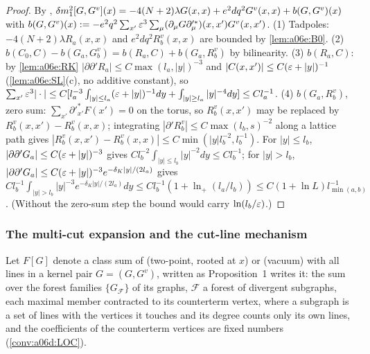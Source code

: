 \begin{proof}
By \cite[(1.23)]{Ba3}, $\delta m^2_1[G,G^v](x)=-4(N+2)\lambda G(x,x)+e^2dq^2G^v(x,x)+b(G,G^v)(x)$ with $b(G,G^v)(x):=-e^2q^2\sum_{x'}\varepsilon^3\sum_\mu(\partial_\mu G\partial'^*_\mu)(x,x')G^v(x,x')$. (1) Tadpoles: $-4(N+2)\lambda R_a(x,x)$ and $e^2dq^2R^v_b(x,x)$ are bounded by \cref{lem:a06e:B0}. (2) $b(C_0,C)-b(G_a,G^v_b)=b(R_a,C)+b(G_a,R^v_b)$ by bilinearity. (3) $b(R_a,C)$: by \cref{lem:a06e:RK} $|\partial\partial'R_a|\le C\max(l_a,|y|)^{-3}$ and $|C(x,x')|\le C(\varepsilon+|y|)^{-1}$ (\cref{lem:a06e:SL}(c), no additive constant), so $\sum_{x'}\varepsilon^3|\cdot|\le C[l_a^{-3}\int_{|y|\le l_a}(\varepsilon+|y|)^{-1}dy+\int_{|y|\ge l_a}|y|^{-4}dy]\le Cl_a^{-1}$. (4) $b(G_a,R^v_b)$, zero sum: $\sum_{x'}\partial'^*_{x'}F(x')=0$ on the torus, so $R^v_b(x,x')$ may be replaced by $R^v_b(x,x')-R^v_b(x,x)$; integrating $|\partial'R^v_b|\le C\max(l_b,s)^{-2}$ along a lattice path gives $|R^v_b(x,x')-R^v_b(x,x)|\le C\min(|y|l_b^{-2},l_b^{-1})$. For $|y|\le l_b$, $|\partial\partial'G_a|\le C(\varepsilon+|y|)^{-3}$ gives $Cl_b^{-2}\int_{|y|\le l_b}|y|^{-2}dy\le Cl_b^{-1}$; for $|y|>l_b$, $|\partial\partial'G_a|\le C(\varepsilon+|y|)^{-3}e^{-\delta_K|y|/(2l_a)}$ gives $Cl_b^{-1}\int_{|y|>l_b}|y|^{-3}e^{-\delta_K|y|/(2l_a)}dy\le Cl_b^{-1}(1+\ln_+(l_a/l_b))\le C(1+\ln L)l_{\min(a,b)}^{-1}$. (Without the zero-sum step the bound would carry $\ln(l_b/\varepsilon)$.)
\end{proof}

\subsubsection*{The multi-cut expansion and the cut-line mechanism}

Let $F[G]$ denote a class sum of \cite[(1.23)]{Ba3} (two-point, rooted at $x$) or \cite[(1.24)]{Ba3} (vacuum) with all lines in a kernel pair $G=(G,G^v)$, written as Proposition~1 writes it: the sum over the forest families $\{G_{\mathcal F}\}$ of its graphs, $\mathcal F$ a forest of divergent subgraphs, each maximal member contracted to its counterterm vertex, where a subgraph is a set of lines with the vertices it touches and its degree \cite[(2.1)]{Ba3} counts only its own lines, and the coefficients of the counterterm vertices are fixed numbers (\cref{conv:a06d:LOC}).

